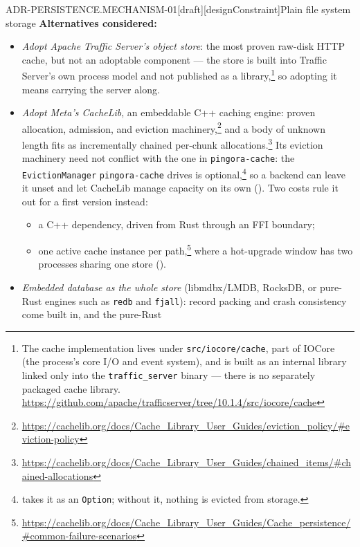 \begin{requirement}{ADR-PERSISTENCE.MECHANISM-01}[draft][designConstraint]{Plain file system storage}
  \textbf{Alternatives considered:}
  \begin{itemize}
    \item \emph{Adopt Apache Traffic Server's object store}: the most
      proven raw-disk HTTP cache, but not an adoptable component --- the
      store is built into Traffic Server's own process model and not
      published as a library,\footnote{The cache implementation lives
      under \texttt{src/iocore/cache}, part of IOCore (the process's core
      I/O and event system), and is built as an internal library linked
      only into the \texttt{traffic\_server} binary --- there is no
      separately packaged cache library.
      \url{https://github.com/apache/trafficserver/tree/10.1.4/src/iocore/cache}}
      so adopting it means carrying the server along.
    \item \emph{Adopt Meta's CacheLib}, an embeddable C++ caching engine:
      proven allocation, admission, and eviction
      machinery,\footnote{\url{https://cachelib.org/docs/Cache_Library_User_Guides/eviction_policy/\#eviction-policy}}
      and a body of unknown length fits as incrementally chained
      per-chunk
      allocations.\footnote{\url{https://cachelib.org/docs/Cache_Library_User_Guides/chained_items/\#chained-allocations}}
      Its eviction machinery need not conflict with
      the one in \texttt{pingora-cache}: the \texttt{EvictionManager}
      \texttt{pingora-cache} drives is
      optional,\footnote{
      takes it as an \texttt{Option}; without it, nothing is evicted
      from storage.} so a backend can leave it unset and let CacheLib
      manage capacity on its own ().
      Two costs rule it out for a first version instead:
      \begin{itemize}
        \item a C++ dependency, driven from Rust through an FFI boundary;
        \item one active cache instance per
          path,\footnote{\url{https://cachelib.org/docs/Cache_Library_User_Guides/Cache_persistence/\#common-failure-scenarios}}
          where a hot-upgrade window has two processes sharing one store
          ().
      \end{itemize}
    \item \emph{Embedded database as the whole store} (libmdbx/LMDB,
      RocksDB, or pure-Rust engines such as \texttt{redb} and \texttt{fjall}):
      record packing and crash consistency come built in, and the pure-Rust

\end{itemize}
\end{requirement}
